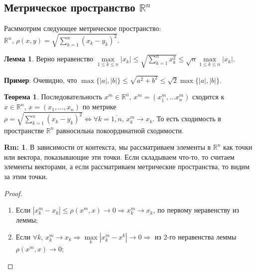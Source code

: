 \documentclass[12pt]{article}
\newcommand{\MR}{\mathbb{R}}
\theoremstyle{definition}
\newtheorem{rem}{Rm:}
\newtheorem{lemma}{Лемма}
\newtheorem{theorem}{Теорема}
\begin{document}
\subsection*{Метрическое пространство $\MR^n$}

Расммотрим следующее метрическое пространство: $\MR^n, \, \rho(x,y) = \sqrt{ \displaystyle \sum\limits_{k=1}^{n}(x_k - y_k)^2}$.
\begin{lemma}
	Верно неравенство $\max\limits_{1 \leq k \leq n} |x_k| \leq \sqrt{\displaystyle \sum\limits_{k=1}^{n}x_k^2} \leq \sqrt{n} \max\limits_{1 \leq k \leq n} |x_k|$.
\end{lemma}
\textbf{Пример}: Очевидно, что $\max\{|a|,|b|\} \leq \sqrt{a^2 + b^2} \leq \sqrt{2}\max\{|a|,|b|\}$.

\begin{theorem}
	Последовательность $x^m \in \MR^n, \, x^m = (x_1^m, \dotsc x_n^m)$ сходится к $x \in \MR^n, \, x = (x_1, \dotsc, x_n)$ по метрике $\rho = \sqrt{ \displaystyle \sum\limits_{k=1}^{n}(x_k - y_k)^2} \Leftrightarrow \forall k = \overline{1,n}, \, x_k^m \to x_k$. То есть сходимость в пространстве $\MR^n$ равносильна покоординатной сходимости.
\end{theorem}
\begin{rem}
	В зависимости от контекста, мы рассматриваем элементы в $\MR^n$ как точки или вектора, показывающие эти точки. Если складываем что-то, то считаем элементы векторами, а если рассматриваем метрические пространства, то видим за этим точки.
\end{rem}
\begin{proof}\hfill
	\begin{enumerate}[label={\arabic*)}]
		\item Если $|x_k^m - x_k| \leq \rho(x^m,x) \to 0 \Rightarrow x_k^m \to x_k$, по первому неравенству из леммы;
		\item Если $\forall k, \, x_k^m \to x_k \Rightarrow \max\limits_{k}|x_k^m - x^k| \to 0 \Rightarrow$ из 2-го неравенства леммы $\rho(x^m,x) \to 0$;
	\end{enumerate}
\end{proof}
\end{document}
